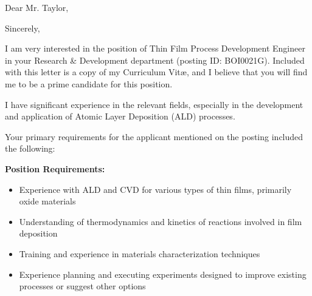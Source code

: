 \documentclass[10pt,letterpaper,sans]{moderncv}
\begin{document}
\closesection{}                   %
\renewcommand{\listitemsymbol}{-} %




%



\newpage
{}
\recomputelengths
\date{\today}
\opening{Dear Mr. Taylor,}
\closing{\vspace{1em}Sincerely,\vspace{-0.5cm}}
\makelettertitle

I am very interested in the position of Thin Film Process Development Engineer in your Research \& Development department (posting ID: BOI0021G). Included with this letter is a copy of my Curriculum Vit\ae{}, and I believe that you will find me to be a prime candidate for this position. 

I have significant experience in the relevant fields, especially in the development and application of Atomic Layer Deposition (ALD) processes. 

\vspace{1.5em}
Your primary requirements for the applicant mentioned on the posting included the following:

\textbf{Position Requirements:}
\begin{itemize}
	\item Experience with ALD and CVD for various types of thin films, primarily oxide materials
	\item Understanding of thermodynamics and kinetics of reactions involved in film deposition
	\item Training and experience in materials characterization techniques
	\item Experience planning and executing experiments designed to improve %
		existing processes or suggest other options
\end{itemize}
\vspace{1.5em}
\end{document}
